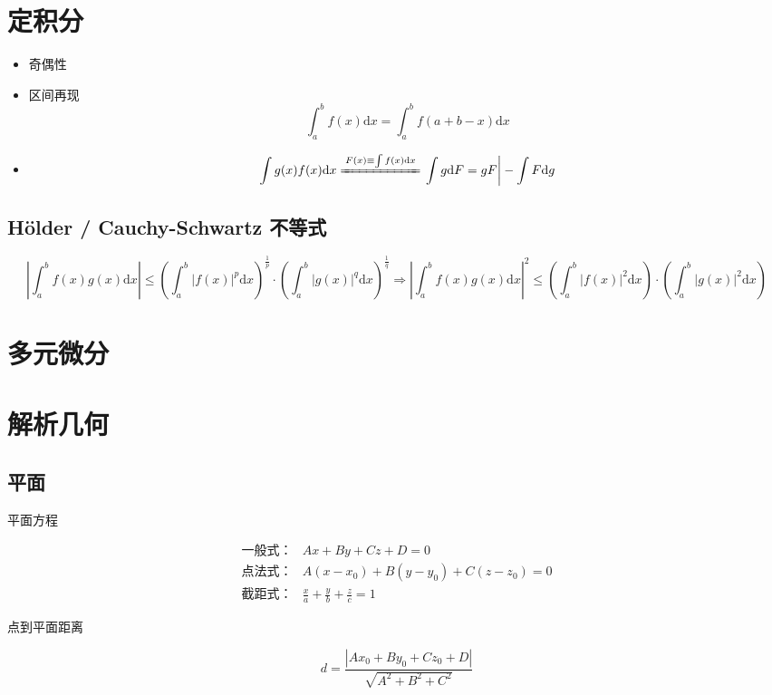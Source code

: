 \documentclass{article}
\begin{document}
\section{定积分}

\begin{itemize}
    \item 奇偶性
    \item 区间再现 \[ \int_a^b f(x) \mathrm{d}x = \int_a^b f(a + b - x) \mathrm{d}x \]
    \item \[ \int g(x) f(x) \mathrm{d}x \xlongequal{F(x) \equiv \int f(x) \mathrm{d}x} \left.\int g \mathrm{d}F = g F\right| - \int F \mathrm{d}g \]
\end{itemize}

\subsection{H\"{o}lder / Cauchy-Schwartz 不等式}

\[ \left| \int_a^b f(x) g(x) \mathrm{d} x \right| \leq \left( \int_a^b |f(x)|^p \mathrm{d} x \right)^{\frac{1}{p}} \cdot \left( \int_a^b |g(x)|^q \mathrm{d} x \right)^{\frac{1}{q}} \Rightarrow \left| \int_a^b f(x) g(x) \mathrm{d} x \right|^2 \leq \left( \int_a^b |f(x)|^2 \mathrm{d} x \right) \cdot \left( \int_a^b |g(x)|^2 \mathrm{d} x \right) \]

\section{多元微分}

\section{解析几何}

\subsection{平面}

平面方程

\begin{align*}
    \text{一般式：} & A x + B y + C z + D = 0                     \\
    \text{点法式：} & A (x - x_0) + B (y - y_0) + C (z - z_0) = 0 \\
    \text{截距式：} & \frac{x}{a} + \frac{y}{b} + \frac{z}{c} = 1
\end{align*}

点到平面距离

\[ d = \frac{|A x_0 + B y_0 + C z_0 + D|}{\sqrt{A^2 + B^2 + C^2}} \]
\end{document}

